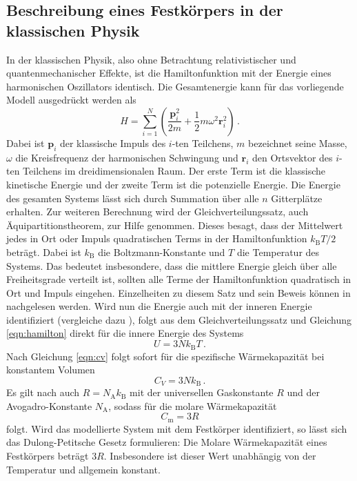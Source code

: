 \subsection{Beschreibung eines Festkörpers in der klassischen Physik}
In der klassischen Physik, also ohne Betrachtung relativistischer und quantenmechanischer
Effekte, ist die Hamiltonfunktion mit der Energie eines harmonischen
Oszillators identisch. Die Gesamtenergie kann für das vorliegende Modell ausgedrückt werden als
\begin{equation}
  H = \sum_{i=1}^N \left(\frac{\symbf{p}_i^2}{2 m} + \frac{1}{2} m \omega^2 \symbf{r}_i^2\right)\,.
  \label{eqn:hamilton}
\end{equation}
Dabei ist $\symbf{p}_i$ der klassische Impuls des $i$-ten Teilchens,
$m$ bezeichnet seine Masse, $\omega$ die Kreisfrequenz der harmonischen Schwingung und $\symbf{r}_i$
den Ortsvektor des $i$-ten Teilchens im dreidimensionalen Raum. Der erste Term ist die klassische kinetische
Energie und der zweite Term ist die potenzielle Energie. Die Energie des gesamten
Systems lässt sich durch Summation über alle $n$ Gitterplätze erhalten.\newline
Zur weiteren Berechnung wird der Gleichverteilungssatz, auch
Äquipartitionstheorem, zur Hilfe genommen.
Dieses besagt, dass der Mittelwert jedes in Ort oder Impuls quadratischen Terms
in der Hamiltonfunktion $k_\text{B} T / 2$ beträgt.
Dabei ist $k_\text{B}$ die Boltzmann-Konstante und $T$ die Temperatur des Systems.
Das bedeutet insbesondere, dass die mittlere Energie gleich über alle
Freiheitsgrade verteilt ist, sollten alle Terme der Hamiltonfunktion quadratisch
in Ort und Impuls eingehen. Einzelheiten zu diesem Satz und sein Beweis können
in \cite{Gleichverteilungssatz} nachgelesen werden.\newline
Wird nun die Energie auch mit der inneren Energie identifiziert (vergleiche dazu \cite{failure}), folgt aus dem Gleichverteilungssatz
und Gleichung \eqref{eqn:hamilton} direkt für die innere Energie des Systems
\begin{equation}
  U = 3 N k_\text{B} T\,.
  \label{eqn:usolid}
\end{equation}
Nach Gleichung \eqref{eqn:cv} folgt sofort für die spezifische Wärmekapazität
bei konstantem Volumen
\begin{equation}
  C_V = 3 N k_\text{B}\,.
  \label{eqn:cvsolid}
\end{equation}
Es gilt nach \cite{failure} auch $R = N_\text{A} k_\text{B}$ mit der universellen Gaskonstante $R$ und der
Avogadro-Konstante $N_\text{A}$, sodass für die molare Wärmekapazität
\begin{equation}
  C_\text{m} = 3 R
  \label{eqn:dulongpetit}
\end{equation}
folgt. Wird das modellierte System mit dem Festkörper identifiziert, so lässt sich
das Dulong-Petitsche Gesetz formulieren: \newline
Die Molare Wärmekapazität eines Festkörpers beträgt $3 R$. Insbesondere ist dieser
Wert unabhängig von der Temperatur und allgemein konstant.
